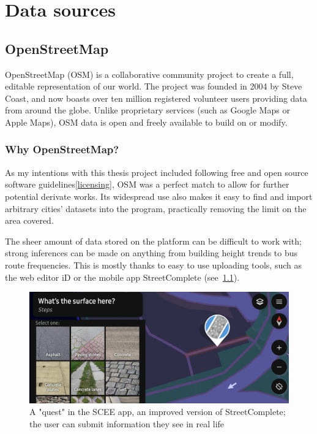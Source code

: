 \chapter{Data sources} %

\section{OpenStreetMap}

OpenStreetMap (OSM) is a collaborative community project to create a full, editable representation of our world. The project was founded in 2004 by Steve Coast, and now boasts over ten million registered volunteer users providing data from around the globe. Unlike proprietary services (such as Google Maps or Apple Maps), OSM data is open and freely available to build on or modify.\cite{osmHistory}

\subsection{Why OpenStreetMap?}

As my intentions with this thesis project included following free and open source software guidelines\ref{licensing}, OSM was a perfect match to allow for further potential derivate works. Its widespread use also makes it easy to find and import arbitrary cities' datasets into the program, practically removing the limit on the area covered.

The sheer amount of data stored on the platform can be difficult to work with; strong inferences can be made on anything from building height trends to bus route frequencies. This is mostly thanks to easy to use uploading tools, such as the web editor iD or the mobile app StreetComplete (see~\ref{scee}).

\begin{figure}[h]
    \centering
    \includegraphics[width=140mm, keepaspectratio]{images/scee_example.jpg}
    \caption{A "quest" in the SCEE app, an improved version of StreetComplete; the user can submit information they see in real life \label{scee}}
\end{figure}

